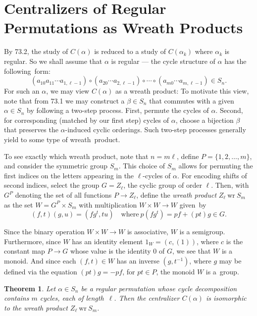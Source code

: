 \documentclass{surv-l}
\numberwithin{equation}{section}
\numberwithin{table}{section}
\numberwithin{figure}{section}
\newtheorem{theorem}[equation]{Theorem}
\theoremstyle{definition}
\begin{document}
\section{Centralizers of Regular Permutations as Wreath Products}\label{secA.74}

By 73.2, the study of $C(\alpha)$ is reduced to a study of
$C(\alpha_{k})$ where $\alpha_{k}$ is regular. So we shall
assume that $\alpha$ is regular --- the cycle structure of
$\alpha$ has the following~form:
\[
(a_{10}a_{11}\cdots a_{1,\ell-1})\circ(a_{20}\cdots a_{2,\ell-1})\circ\cdots\circ(a_{m0}\cdots a_{m,\ell-1})\in S_{n}.
\]
For such an $\alpha$, we may view $C(\alpha)$ as a wreath
product: To motivate this view, note that from 73.1 we may
construct a $\beta\in S_{n}$ that commutes with a given
$\alpha\in S_{n}$ by following a two-step process. First,
permute the cycles of $\alpha$. Second, for corresponding
(matched by our first step) cycles of $\alpha$, choose a
bijection $\beta$ that preserves the $\alpha$-induced cyclic
orderings. Such two-step processes generally yield to some
type of wreath~product.

To see exactly which wreath product, note that $n =m\ell$, define
$P= \{1,2,\ldots, m\}$, and consider the symmetric group $S_{m}$.
This choice of $S_{m}$ allows for permuting the first indices on
the letters appearing in the $\ell$-cycles of $\alpha$. For
encoding shifts of second indices, select the group $G=Z_{\ell}$,
the cyclic group of order $\ell$. Then, with $G^{P}$ denoting the
set of all functions $P\rightarrow Z_{\ell}$, define the
\emph{wreath product} $Z_{\ell}\
\mathrm{wr}\ S_{m}$ as the set $W=G^{P}\times S_{m}$ with
multiplication $W\times W\rightarrow W$ given~by
\[
(f, t)(g, u)=(fg^{t}, tu)\quad \mathrm{where}\
p(fg^{t})=pf+(pt)g\in G.
\]

Since the binary operation $W\times W\rightarrow W$ is
associative, $W$ is a semigroup. Furthermore, since $W$ has an
identity element $1_{W}= (c,(1))$, where $c$ is the constant
map $P\rightarrow G$ whose value is the identity $0$ of $G$,
we see that $W$ is a monoid. And since each $(f, t)\in W$ has
an inverse $(g,t^{-1})$, where $g$ may be defined via the
equation $(pt)g=-pf$, for $pt\in P$, the monoid $W$ is
a~group.

\begin{theorem}\label{thmA.74.1}
Let $\alpha\in S_{n}$ be a regular permutation\index{regular
permutation} whose cycle decomposition contains $m$ cycles, each
of length~$\ell$. Then the centralizer $C(\alpha)$ is isomorphic
to the wreath product $Z_{\ell}\ \mathrm{wr}\ S_{m}$.
\end{theorem}
\end{document}

